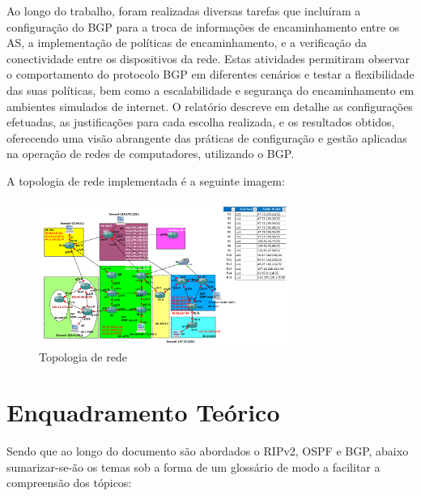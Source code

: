 \documentclass[11pt,english, openright, oneside]{book}
\begin{document}
\par Ao longo do trabalho, foram realizadas diversas tarefas que incluíram a configuração do BGP para a troca de informações de encaminhamento entre os AS, a implementação de políticas de encaminhamento, e a verificação da conectividade entre os dispositivos da rede. Estas atividades permitiram observar o comportamento do protocolo BGP em diferentes cenários e testar a flexibilidade das suas políticas, bem como a escalabilidade e segurança do encaminhamento em ambientes simulados de internet. O relatório descreve em detalhe as configurações efetuadas, as justificações para cada escolha realizada, e os resultados obtidos, oferecendo uma visão abrangente das práticas de configuração e gestão aplicadas na operação de redes de computadores, utilizando o BGP.
\vspace{0.2cm}

\par A topologia de rede implementada é a seguinte imagem:
\vspace{0.2cm}

\begin{figure}[H]
  \centering
  \includegraphics[width=0.73\textwidth]{imagens/topologia.png}
  \caption{Topologia de rede}
  \label{fig:topologia}
\end{figure}

\pagebreak

\chapter{Enquadramento Teórico}
\vspace{0.2cm}

Sendo que ao longo do documento são abordados o RIPv2, OSPF e BGP, abaixo sumarizar-se-ão os temas 
sob a forma de um glossário de modo a facilitar a compreensão dos tópicos: 
\end{document}
